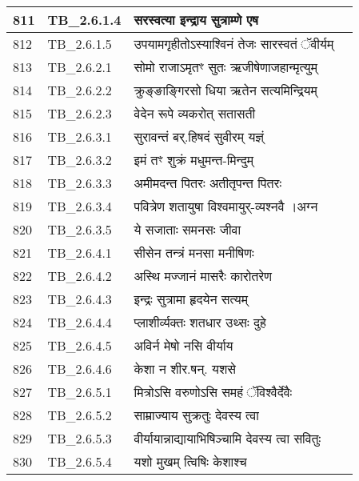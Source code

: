 \documentclass[17pt]{extarticle}
\begin{document}
\begin{longtable}{||p{0.4in}||p{0.9in}||p{4.0in}||p{0.9in}||}
        \hline
            811 & TB\_2.6.1.4 & सरस्वत्या इन्द्राय सुत्राम्णे एष &      \\
        \hline
            812 & TB\_2.6.1.5 & उपयामगृहीतोऽस्याश्विनं तेजः सारस्वतं ॅवीर्यम् &      \\
        \hline
            813 & TB\_2.6.2.1 & सोमो राजाऽमृतꣳ सुतः ऋजीषेणाजहान्मृत्युम् &      \\
        \hline
            814 & TB\_2.6.2.2 & क्रुङ्ङाङ्गिरसो धिया ऋतेन सत्यमिन्द्रियम् &      \\
        \hline
            815 & TB\_2.6.2.3 & वेदेन रूपे व्यकरोत् सतासती &      \\
        \hline
            816 & TB\_2.6.3.1 & सुरावन्तं बर्.हिषदं सुवीरम् यज्ञ्ं &      \\
        \hline
            817 & TB\_2.6.3.2 & इमं तꣳ शुक्रं मधुमन्त{-}मिन्दुम् &      \\
        \hline
            818 & TB\_2.6.3.3 & अमीमदन्त पितरः अतीतृपन्त पितरः &      \\
        \hline
            819 & TB\_2.6.3.4 & पवित्रेण शतायुषा विश्वमायुर्{-}व्यश्नवै ।अग्न &      \\
        \hline
            820 & TB\_2.6.3.5 & ये सजाताः समनसः जीवा &      \\
        \hline
            821 & TB\_2.6.4.1 & सीसेन तन्त्रं मनसा मनीषिणः &      \\
        \hline
            822 & TB\_2.6.4.2 & अस्थि मज्जानं मासरैः कारोतरेण &      \\
        \hline
            823 & TB\_2.6.4.3 & इन्द्रः सुत्रामा हृदयेन सत्यम् &      \\
        \hline
            824 & TB\_2.6.4.4 & प्लाशीर्व्यक्तः शतधार उथ्सः दुहे &      \\
        \hline
            825 & TB\_2.6.4.5 & अविर्न मेषो नसि वीर्याय &      \\
        \hline
            826 & TB\_2.6.4.6 & केशा न शीर.षन्. यशसे &      \\
        \hline
            827 & TB\_2.6.5.1 & मित्रोऽसि वरुणोऽसि समहं ॅविश्वैर्देवैः &      \\
        \hline
            828 & TB\_2.6.5.2 & साम्राज्याय सुक्रतुः देवस्य त्वा &      \\
        \hline
            829 & TB\_2.6.5.3 & वीर्यायान्नाद्यायाभिषिञ्चामि देवस्य त्वा सवितुः &      \\
        \hline
            830 & TB\_2.6.5.4 & यशो मुखम् त्विषिः केशाश्च &      \\

\end{longtable}
\end{document}
